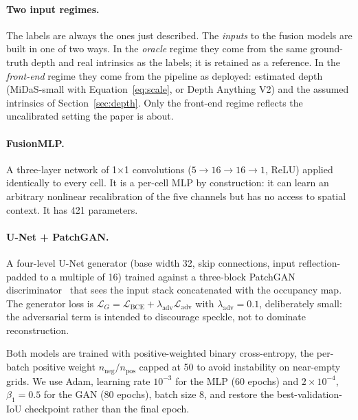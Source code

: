 \documentclass[sigconf]{acmart}
\newenvironment{revised}{\color{revcolor}}{}
\begin{document}
\begin{revised}
\paragraph{Two input regimes.} The labels are always the ones just described. The \emph{inputs} to the fusion models are built in one of two ways. In the \emph{oracle} regime they come from the same ground-truth depth and real intrinsics as the labels; it is retained as a reference. In the \emph{front-end} regime they come from the pipeline as deployed: estimated depth (MiDaS-small with Equation~\eqref{eq:scale}, or Depth Anything V2) and the assumed intrinsics of Section~\ref{sec:depth}. Only the front-end regime reflects the uncalibrated setting the paper is about.
\end{revised}

\paragraph{FusionMLP.} A three-layer network of 1$\times$1 convolutions ($5 \rightarrow 16 \rightarrow 16 \rightarrow 1$, ReLU) applied identically to every cell. It is a per-cell MLP by construction: it can learn an arbitrary nonlinear recalibration of the five channels but has no access to spatial context. It has 421 parameters.

\paragraph{U-Net + PatchGAN.} A four-level U-Net generator (base width 32, skip connections, input reflection-padded to a multiple of 16) trained against a three-block PatchGAN discriminator~\cite{isola2017pix2pix} that sees the input stack concatenated with the occupancy map. The generator loss is $\mathcal{L}_G = \mathcal{L}_{\text{BCE}} + \lambda_{\text{adv}}\mathcal{L}_{\text{adv}}$ with $\lambda_{\text{adv}} = 0.1$, deliberately small: the adversarial term is intended to discourage speckle, not to dominate reconstruction.

Both models are trained with positive-weighted binary cross-entropy, the per-batch positive weight $n_{\text{neg}}/n_{\text{pos}}$ capped at 50 to avoid instability on near-empty grids. We use Adam, learning rate $10^{-3}$ for the MLP (60 epochs) and $2\times10^{-4}$, $\beta_1 = 0.5$ for the GAN (80 epochs), batch size 8, and restore the best-validation-IoU checkpoint rather than the final epoch.
\end{document}
